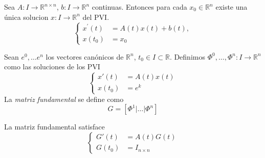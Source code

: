  \begin{teorema}{} Sea $A:I \rightarrow \mathbb{R}^{n \times n}$, $b: I \rightarrow \mathbb{R}^{n}$ continuas. Entonces para cada $x_{0} \in \mathbb{R}^{n}$ existe una única solucion $x: I \rightarrow \mathbb{R}^{n}$ del PVI.
$$
\left\{
\begin{array}{ll}
 x^{\prime}(t)&=A(t) x(t)+b(t), \\
 x\left(t_{0}\right)&=x_{0}
\end{array}
\right.
$$
\end{teorema}
 
 
\begin{definicion} Sean $e^0, \ldots e^{n}$ los vectores canónicos de $\mathbb{R}^{n}$, $t_0\in I\subset\mathbb{R}$. Definimos $\Phi^{0}, \ldots, \Phi^{n}:I \rightarrow \mathbb{R}^{n}$ como
las soluciones de los PVI
\[
\left\{
\begin{split}
{x}'(t)&=A(t)x(t) \\
x(t_{0})&=e^{k}
\end{split}
\right.
\]
La \emph{matriz fundamental} se define como
$$
G=\left[\Phi^{1}|\ldots| \Phi^{n}\right]
$$
\end{definicion}

\begin{observa} La matriz fundamental satisface
$$
\left\{
\begin{split}
{G}'(t)&=A(t) G(t) \\
G(t_0)&=I_{n\times n}
\end{split}\right.
$$
\end{observa}

